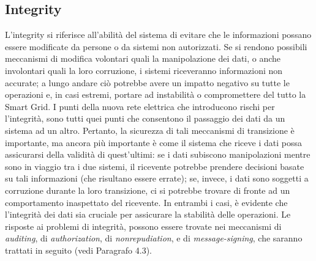 \subsection{Integrity}
L'integrity si riferisce all'abilità del sistema di evitare che le informazioni possano essere modificate da persone o da sistemi non autorizzati. \newline Se si rendono possibili meccanismi di modifica volontari quali la manipolazione dei dati, o anche involontari quali la loro corruzione, i sistemi riceveranno informazioni non accurate; a lungo andare ciò potrebbe avere un impatto negativo su tutte le operazioni e, in casi estremi, portare ad instabilità o compromettere del tutto la Smart Grid. \newline
I punti della nuova rete elettrica che introducono rischi per l'integrità, sono tutti quei punti che consentono il passaggio dei dati da un sistema ad un altro. Pertanto, la sicurezza di tali meccanismi di transizione è importante, ma ancora più importante è come il sistema che riceve i dati possa assicurarsi della validità di quest'ultimi: se i dati subiscono manipolazioni mentre sono in viaggio tra i due sistemi, il ricevente potrebbe prendere decisioni basate su tali informazioni (che risultano essere errate); se, invece, i dati sono soggetti a corruzione durante la loro transizione, ci si potrebbe trovare di fronte ad un comportamento inaspettato del ricevente. In entrambi i casi, è evidente che l'integrità dei dati sia cruciale per assicurare la stabilità delle operazioni.   \newline
Le risposte ai problemi di integrità, possono essere trovate nei meccanismi di \textit{auditing}, di \textit{authorization}, di \textit{nonrepudiation}, e di \textit{message-signing}, che saranno trattati in seguito (vedi Paragrafo 4.3).


